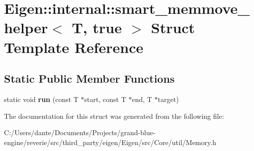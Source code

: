 \hypertarget{struct_eigen_1_1internal_1_1smart__memmove__helper_3_01_t_00_01true_01_4}{}\section{Eigen\+::internal\+::smart\+\_\+memmove\+\_\+helper$<$ T, true $>$ Struct Template Reference}
\label{struct_eigen_1_1internal_1_1smart__memmove__helper_3_01_t_00_01true_01_4}
\subsection*{Static Public Member Functions}
\begin{DoxyCompactItemize}
\item 
\mbox{\label{struct_eigen_1_1internal_1_1smart__memmove__helper_3_01_t_00_01true_01_4_a34f6b783caad68de6b232f505bc74dde}} 
static void {\bfseries run} (const T $\ast$start, const T $\ast$end, T $\ast$target)
\end{DoxyCompactItemize}


The documentation for this struct was generated from the following file\+:\begin{DoxyCompactItemize}
\item 
C\+:/\+Users/dante/\+Documents/\+Projects/grand-\/blue-\/engine/reverie/src/third\+\_\+party/eigen/\+Eigen/src/\+Core/util/Memory.\+h\end{DoxyCompactItemize}
